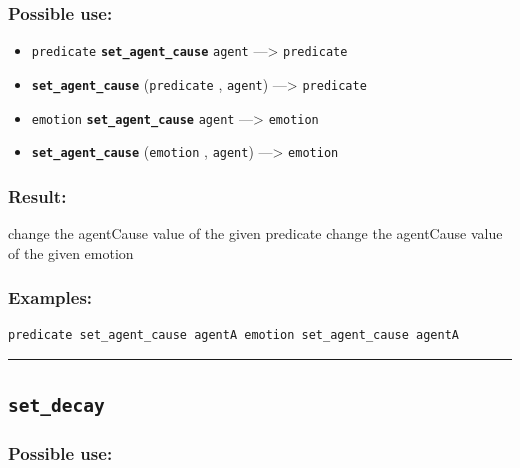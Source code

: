 \documentclass[]{book}
\providecommand{\tightlist}{%
  \setlength{\itemsep}{0pt}\setlength{\parskip}{0pt}}
\theoremstyle{definition}
\theoremstyle{definition}
\theoremstyle{definition}
\theoremstyle{remark}
\begin{document}
\subsubsection{Possible use:}\label{possible-use-456}

\begin{itemize}
\tightlist
\item
  \texttt{predicate} \textbf{\texttt{set\_agent\_cause}} \texttt{agent}
  ---\textgreater{} \texttt{predicate}
\item
  \textbf{\texttt{set\_agent\_cause}} (\texttt{predicate} ,
  \texttt{agent}) ---\textgreater{} \texttt{predicate}
\item
  \texttt{emotion} \textbf{\texttt{set\_agent\_cause}} \texttt{agent}
  ---\textgreater{} \texttt{emotion}
\item
  \textbf{\texttt{set\_agent\_cause}} (\texttt{emotion} ,
  \texttt{agent}) ---\textgreater{} \texttt{emotion}
\end{itemize}

\subsubsection{Result:}\label{result-440}

change the agentCause value of the given predicate change the agentCause
value of the given emotion

\subsubsection{Examples:}\label{examples-313}

\begin{verbatim}
predicate set_agent_cause agentA emotion set_agent_cause agentA 
\end{verbatim}

\begin{center}\rule{0.5\linewidth}{\linethickness}\end{center}

\subsection{\texorpdfstring{\texttt{set\_decay}}{set\_decay}}\label{set_decay}

\subsubsection{Possible use:}\label{possible-use-457}
\end{document}
